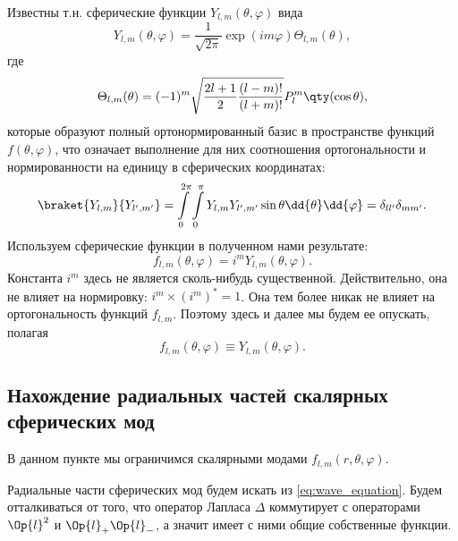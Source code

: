     Известны т.н. сферические функции $Y_{l,m}(\theta,\varphi)$ вида
    \begin{equation}
        Y_{l,m}(\theta,\varphi) = \frac{1}{\sqrt{2\pi}} \exp(im\varphi) \Theta_{l,m}(\theta) ,
    \end{equation}
    где
    \begin{equation}
        \Theta_{l,m}(\theta) = (-1)^m \sqrt{
            \frac{2l + 1}{2} \frac{(l-m)!}{(l+m)!}
        } P^m_l\qty(\cos\theta) ,
    \end{equation}
    которые образуют полный ортонормированный базис в пространстве функций $f(\theta,\varphi)$, что означает выполнение для них соотношения ортогональности и нормированности на единицу в сферических координатах:
    \begin{equation}
        \braket{Y_{l,m}}{Y_{l',m'}}
            = \int\limits_0^{2\pi} \int\limits_0^\pi {
                Y_{l,m} Y_{l',m'} \sin\theta
            } \dd{\theta} \dd{\varphi}
            = \delta_{ll'} \delta_{mm'} .
    \end{equation}
    Используем сферические функции в полученном нами результате:
    \begin{equation}
        f_{l,m}(\theta,\varphi)
            = i^m Y_{l,m}(\theta,\varphi) .
    \end{equation}
    Константа $i^m$ здесь не является сколь-нибудь существенной. Действительно, она не влияет на нормировку: $i^m \times (i^m)^* = 1$. Она тем более никак не влияет на ортогональность функций $f_{l,m}$. Поэтому здесь и далее мы будем ее опускать, полагая
    \begin{equation}
        f_{l,m}(\theta,\varphi) \equiv Y_{l,m}(\theta,\varphi) .
    \end{equation}

%
%
%
%
%
%

\subsection{Нахождение радиальных частей скалярных сферических мод}

    В данном пункте мы ограничимся скалярными модами $f_{l,m}(r,\theta,\varphi)$.

    Радиальные части сферических мод будем искать из \autoref{eq:wave_equation}. Будем отталкиваться от того, что оператор Лапласа $\Delta$ коммутирует с операторами $\Op{l}^2$ и $\Op{l}_{+} \Op{l}_{-}$, а значит имеет с ними общие собственные функции.

